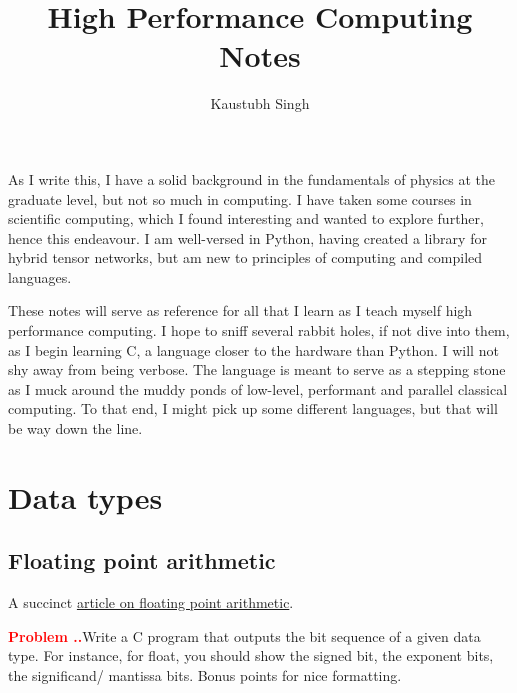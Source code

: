 \documentclass{article}
\title{High Performance Computing Notes}
\author{Kaustubh Singh}
\newcounter{problem}[subsection]
\renewcommand{\theproblem}{\thesubsection.\arabic{problem}}
\newcommand{\problem}[1]{%
  \refstepcounter{problem}%
  \par\noindent\textcolor{red}{\textbf{Problem \theproblem.}}\;#1\par
}
\newcommand{\vs}{
    \vspace{1em}
}
\begin{document}
\maketitle

\begin{center}
    As I write this, I have a solid background in the fundamentals of physics at the graduate level, but not so much in computing. I have taken some courses in scientific computing, which I found interesting and wanted to explore further, hence this endeavour. I am well-versed in Python, having created a library for hybrid tensor networks, but am new to principles of computing and compiled languages. 

    \vs 
    
    These notes will serve as reference for all that I learn as I teach myself high performance computing. I hope to sniff several rabbit holes, if not dive into them, as I begin learning C, a language closer to the hardware than Python. I will not shy away from being verbose. The language is meant to serve as a stepping stone as I muck around the muddy ponds of low-level, performant and parallel classical computing. To that end, I might pick up some different languages, but that will be way down the line. 
\end{center}

\section{Data types}
\subsection{Floating point arithmetic}
A succinct \href{https://www.phys.uconn.edu/~rozman/Courses/P2200_15F/downloads/floating-point-guide-2015-10-1}{article on floating point arithmetic}.

\vs 

\problem{Write a C program that outputs the bit sequence of a given data type. For instance, for float, you should show the signed bit, the exponent bits, the significand/ mantissa bits. Bonus points for nice formatting.}

\vs
\end{document}
